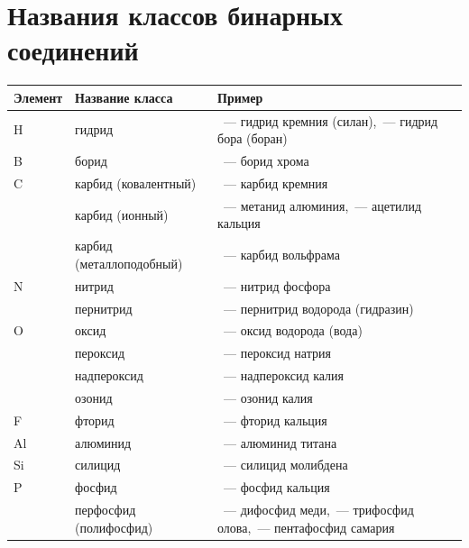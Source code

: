 \newpage

\section{Названия классов бинарных соединений}\label{appendix:names_of_classes_of_binary_compounds}

\begin{table}[htbp]
    \small
    \begin{tabularx}{\textwidth}{
        >{\hsize}Y
        >{\hsize}Y
        >{\hsize}Y
        }
        \hline
        Элемент & Название класса & Пример \\
        \hline
        H & гидрид & ~--- гидрид кремния (силан),\newline{}~--- гидрид бора (боран) \\
        \hline
        B & борид & ~--- борид хрома \\
        \hline
        C & карбид (ковалентный) & ~--- карбид кремния \\
         & карбид (ионный) & ~--- метанид алюминия,\newline{}~--- ацетилид кальция \\
         & карбид (металлоподобный) & ~--- карбид вольфрама \\
        \hline
        N & нитрид & ~--- нитрид фосфора \\
         & пернитрид & ~--- пернитрид водорода (гидразин) \\
        \hline
        O & оксид & ~--- оксид водорода (вода) \\
         & пероксид & ~--- пероксид натрия \\
         & надпероксид & ~--- надпероксид калия \\
         & озонид & ~--- озонид калия \\
        \hline
        F & фторид & ~--- фторид кальция \\
        \hline
        Al & алюминид & ~--- алюминид титана \\
        \hline
        Si & силицид & ~--- силицид молибдена \\
        \hline
        P & фосфид & ~--- фосфид кальция \\
         & перфосфид (полифосфид) & ~--- дифосфид меди,\newline{}~--- трифосфид олова,\newline{}~--- пентафосфид самария \\

\end{tabularx}
\end{table}
